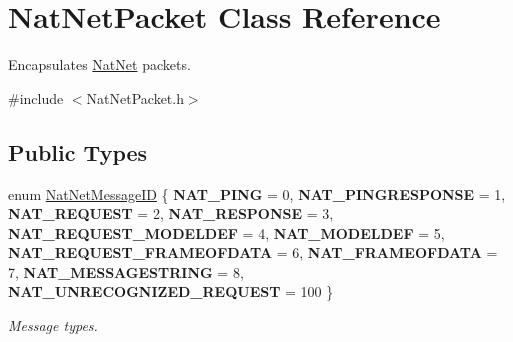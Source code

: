 \hypertarget{classNatNetPacket}{\section{\-Nat\-Net\-Packet \-Class \-Reference}
\label{classNatNetPacket}
}


\-Encapsulates \hyperlink{classNatNet}{\-Nat\-Net} packets.  




{\ttfamily \#include $<$\-Nat\-Net\-Packet.\-h$>$}

\subsection*{\-Public \-Types}
\begin{DoxyCompactItemize}
\item 
enum \hyperlink{classNatNetPacket_af9a3198d39270f9703a36c414079ab51}{\-Nat\-Net\-Message\-I\-D} \{ \*
{\bfseries \-N\-A\-T\-\_\-\-P\-I\-N\-G} =  0, 
{\bfseries \-N\-A\-T\-\_\-\-P\-I\-N\-G\-R\-E\-S\-P\-O\-N\-S\-E} =  1, 
{\bfseries \-N\-A\-T\-\_\-\-R\-E\-Q\-U\-E\-S\-T} =  2, 
{\bfseries \-N\-A\-T\-\_\-\-R\-E\-S\-P\-O\-N\-S\-E} =  3, 
\*
{\bfseries \-N\-A\-T\-\_\-\-R\-E\-Q\-U\-E\-S\-T\-\_\-\-M\-O\-D\-E\-L\-D\-E\-F} =  4, 
{\bfseries \-N\-A\-T\-\_\-\-M\-O\-D\-E\-L\-D\-E\-F} =  5, 
{\bfseries \-N\-A\-T\-\_\-\-R\-E\-Q\-U\-E\-S\-T\-\_\-\-F\-R\-A\-M\-E\-O\-F\-D\-A\-T\-A} =  6, 
{\bfseries \-N\-A\-T\-\_\-\-F\-R\-A\-M\-E\-O\-F\-D\-A\-T\-A} =  7, 
\*
{\bfseries \-N\-A\-T\-\_\-\-M\-E\-S\-S\-A\-G\-E\-S\-T\-R\-I\-N\-G} =  8, 
{\bfseries \-N\-A\-T\-\_\-\-U\-N\-R\-E\-C\-O\-G\-N\-I\-Z\-E\-D\-\_\-\-R\-E\-Q\-U\-E\-S\-T} =  100
 \}
\begin{DoxyCompactList}\small\item\em \-Message types. \end{DoxyCompactList}\end{DoxyCompactItemize}
